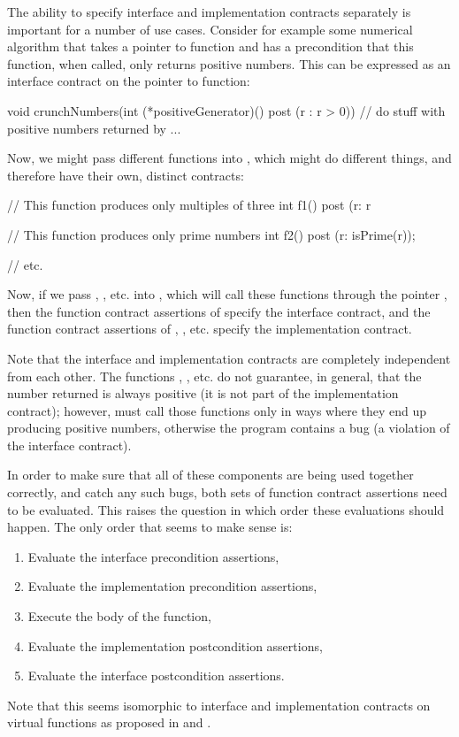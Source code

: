 The ability to specify interface and implementation contracts separately is important for a number of use cases. Consider for example some numerical algorithm  that takes a pointer to function and has a precondition that this function, when called, only returns positive numbers. This can be expressed as an interface contract on the pointer to function:
\begin{codeblock}
void crunchNumbers(int (*positiveGenerator)() post (r : r > 0)) {
  // do stuff with positive numbers returned by ...
}
\end{codeblock}
Now, we might pass different functions into , which might do different things, and therefore have their own, distinct contracts:
\begin{codeblock}
// This function produces only multiples of three
int f1() post (r: r %

// This function produces only prime numbers
int f2() post (r: isPrime(r));

// etc.
\end{codeblock}
Now, if we pass , , etc. into , which will call these functions through the pointer , then the function contract assertions of  specify the interface contract, and the function contract assertions of , , etc. specify the implementation contract.

Note that the interface and implementation contracts are completely independent from each other. The functions , , etc. do not guarantee, in general, that the number returned is always positive (it is not part of the implementation contract); however,  must call those
functions only in ways where they end up producing positive numbers, otherwise the program contains a bug (a violation of the interface contract). 

In order to make sure that all of these components are being used together correctly, and catch any such bugs, both sets of function contract assertions need to be evaluated. This raises the question in which order these evaluations should happen. The only order that seems to make sense is:
\begin{enumerate}
\item Evaluate the interface precondition assertions,
\item Evaluate the implementation precondition assertions,
\item Execute the body of the function,
\item Evaluate the implementation postcondition assertions,
\item Evaluate the interface postcondition assertions.
\end{enumerate}
Note that this seems isomorphic to interface and implementation contracts on virtual functions as proposed in \cite{P3097R0} and \cite{P3165R0}.

